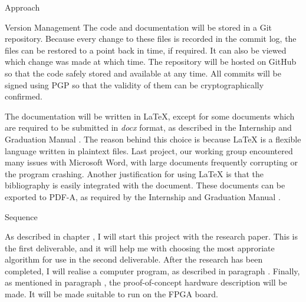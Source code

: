 \documentclass{matthijs}
\begin{document}
\begin{hoofdstuk}{Approach}
\begin{paragraaf}{Version Management}
			The code and documentation will be stored in a Git repository.
			Because every change to these files is recorded in the commit log, the files can be restored to a point back in time, if required.
			It can also be viewed which change was made at which time.
			The repository will be hosted on GitHub so that the code safely stored and available at any time.
			All commits will be signed using PGP so that the validity of them can be cryptographically confirmed.
			
			\bigskip
			
			The documentation will be written in LaTeX, except for some documents which are required to be submitted in \textit{docx} format, as described in the Internship and Graduation Manual \cite{windesheim2021handleiding}.
			The reason behind this choice is because LaTeX is a flexible language written in plaintext files.
			Last project, our working group encountered many issues with Microsoft Word, with large documents frequently corrupting or the program crashing.
			Another justification for using LaTeX is that the bibliography is easily integrated with the document.
			These documents can be exported to PDF-A, as required by the Internship and Graduation Manual \cite{windesheim2021handleiding}.

		\end{paragraaf}

		\begin{paragraaf}{Sequence}

			As described in chapter , I will start this project with the research paper.
			This is the first deliverable, and it will help me with choosing the most approriate algorithm for use in the second deliverable.
			After the research has been completed, I will realise a computer program, as described in paragraph .
			Finally, as mentioned in paragraph , the proof-of-concept hardware description will be made.
			It will be made suitable to run on the FPGA board.
			
		\end{paragraaf}

	\end{hoofdstuk}
\end{document}

